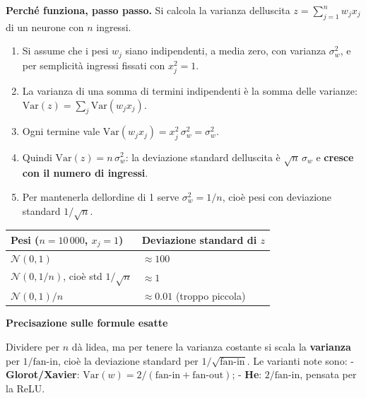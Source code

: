 \documentclass[11pt,a4paper,oneside,openany]{book}
\providecommand{\tightlist}{\setlength{\itemsep}{0pt}\setlength{\parskip}{0pt}}
\renewenvironment{quote}{\list{}{\leftmargin=1em\rightmargin=0pt}\item\relax}{\endlist}
\begin{document}
\textbf{Perché funziona, passo passo.} Si calcola la varianza dell\textquotesingle uscita \(z = \sum_{j=1}^{n} w_j x_j\) di un neurone con \(n\) ingressi.

\begin{enumerate}
\def\labelenumi{\arabic{enumi}.}
\tightlist
\item
  Si assume che i pesi \(w_j\) siano indipendenti, a media zero, con varianza \(\sigma_w^2\), e per semplicità ingressi fissati con \(x_j^2 = 1\).
\item
  La varianza di una somma di termini indipendenti è la somma delle varianze: \(\text{Var}(z) = \sum_j \text{Var}(w_j x_j)\).
\item
  Ogni termine vale \(\text{Var}(w_j x_j) = x_j^2\,\sigma_w^2 = \sigma_w^2\).
\item
  Quindi \(\text{Var}(z) = n\,\sigma_w^2\): la deviazione standard dell\textquotesingle uscita è \(\sqrt{n}\,\sigma_w\) e \textbf{cresce con il numero di ingressi}.
\item
  Per mantenerla dell\textquotesingle ordine di 1 serve \(\sigma_w^2 = 1/n\), cioè pesi con deviazione standard \(1/\sqrt{n}\).
\end{enumerate}

\begin{longtable}[]{@{}ll@{}}
\toprule\noalign{}
Pesi (\(n = 10\,000\), \(x_j = 1\)) & Deviazione standard di \(z\) \\
\midrule\noalign{}
\endhead
\bottomrule\noalign{}
\endlastfoot
\(\mathcal{N}(0, 1)\) & \(\approx 100\) \\
\(\mathcal{N}(0, 1/n)\), cioè std \(1/\sqrt{n}\) & \(\approx 1\) \\
\(\mathcal{N}(0,1)/n\) & \(\approx 0.01\) (troppo piccola) \\
\end{longtable}

\begin{quote}
\textbf{Precisazione sulle formule esatte}
\end{quote}

\begin{quote}
Dividere per \(n\) dà l\textquotesingle idea, ma per tenere la varianza costante si scala la \textbf{varianza} per \(1/\text{fan-in}\), cioè la deviazione standard per \(1/\sqrt{\text{fan-in}}\). Le varianti note sono: - \textbf{Glorot/Xavier}: \(\text{Var}(w) = 2/(\text{fan-in} + \text{fan-out})\); - \textbf{He}: \(2/\text{fan-in}\), pensata per la ReLU.
\end{quote}
\end{document}
